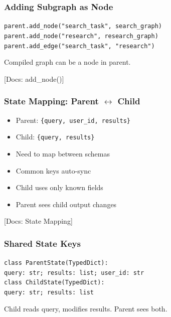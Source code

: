 \documentclass[aspectratio=169,11pt]{beamer}
\newcommand{\docref}[1]{{\scriptsize\color{docgray}[Docs: #1]}}
\begin{document}
\begin{frame}
\frametitle{Adding Subgraph as Node}
\begin{tipbox}
\texttt{parent.add\_node("search\_task", search\_graph)}\\
\texttt{parent.add\_node("research", research\_graph)}\\
\texttt{parent.add\_edge("search\_task", "research")}
\end{tipbox}
\vspace{0.1cm}
\begin{tipbox}
Compiled graph can be a node in parent.
\end{tipbox}
\docref{add\_node()}
\end{frame}

\begin{frame}
\frametitle{State Mapping: Parent $\leftrightarrow$ Child}
\begin{warningbox}[Challenge]
\setlength{\itemsep}{1pt}
\begin{itemize}
\item Parent: \texttt{\{query, user\_id, results\}}
\item Child: \texttt{\{query, results\}}
\item Need to map between schemas
\end{itemize}
\end{warningbox}
\vspace{0.1cm}
\begin{tipbox}
\setlength{\itemsep}{1pt}
\begin{itemize}
\item Common keys auto-sync
\item Child uses only known fields
\item Parent sees child output changes
\end{itemize}
\end{tipbox}
\docref{State Mapping}
\end{frame}

\begin{frame}
\frametitle{Shared State Keys}
\begin{tipbox}
\texttt{class ParentState(TypedDict):}\\
\texttt{query: str; results: list; user\_id: str}\\
\texttt{class ChildState(TypedDict):}\\
\texttt{query: str; results: list}
\end{tipbox}
\vspace{0.1cm}
\begin{tipbox}[Behavior]
Child reads query, modifies results. Parent sees both.
\end{tipbox}
\end{frame}
\end{document}
